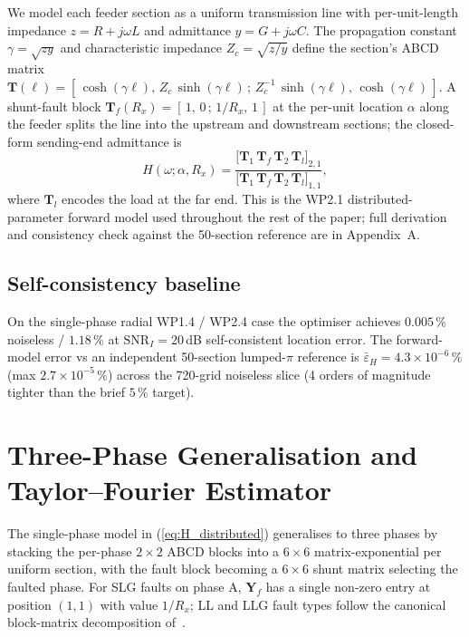 \documentclass[journal]{IEEEtran}
\newcommand{\headlineLocErrSelfConsistent}{$0.005\,\%$ noiseless / $1.18\,\%$ at $\mathrm{SNR}_I = 20$\,dB}
\newcommand{\headlineForwardErr}{$\bar{\varepsilon}_H = 4.3\!\times\!10^{-6}\,\%$ (max $2.7\!\times\!10^{-5}\,\%$)}
\begin{document}
We model each feeder section as a uniform transmission line
with per-unit-length impedance $z = R + j\omega L$ and
admittance $y = G + j\omega C$.  The propagation constant
$\gamma = \sqrt{zy}$ and characteristic impedance
$Z_c = \sqrt{z/y}$ define the section's ABCD matrix
$\boldsymbol{T}(\ell) = [\,\cosh(\gamma \ell),\, Z_c\,
\sinh(\gamma \ell)\,;\, Z_c^{-1}\,\sinh(\gamma \ell),\,
\cosh(\gamma \ell)\,]$.  A shunt-fault block
$\boldsymbol{T}_f(R_x) = [\,1,\,0\,;\,1/R_x,\,1\,]$ at the per-unit
location $\alpha$ along the feeder splits the line into the
upstream and downstream sections; the closed-form sending-end
admittance is
\begin{equation}
H(\omega; \alpha, R_x) =
  \frac{\bigl[\boldsymbol{T}_1\,\boldsymbol{T}_f\,\boldsymbol{T}_2\,\boldsymbol{T}_l\bigr]_{2,1}}
       {\bigl[\boldsymbol{T}_1\,\boldsymbol{T}_f\,\boldsymbol{T}_2\,\boldsymbol{T}_l\bigr]_{1,1}},
\label{eq:H_distributed}
\end{equation}
where $\boldsymbol{T}_l$ encodes the load at the far end.  This
is the WP2.1 distributed-parameter forward model used throughout
the rest of the paper; full derivation and consistency check
against the 50-section reference are in Appendix~A.

\subsection{Self-consistency baseline}
On the single-phase radial WP1.4 / WP2.4 case the optimiser
achieves \headlineLocErrSelfConsistent{} self-consistent
location error.  The forward-model error vs an independent
50-section lumped-$\pi$ reference is \headlineForwardErr{}
across the 720-grid noiseless slice (4 orders of magnitude
tighter than the brief $5\,\%$ target).

\section{Three-Phase Generalisation and Taylor--Fourier Estimator}\label{sec:tphase}

The single-phase model in (\ref{eq:H_distributed}) generalises
to three phases by stacking the per-phase $2 \times 2$ ABCD
blocks into a $6 \times 6$ matrix-exponential per uniform
section, with the fault block becoming a $6 \times 6$ shunt
matrix selecting the faulted phase.  For SLG faults on phase
A, $\boldsymbol{Y}_f$ has a single non-zero entry at position
$(1, 1)$ with value $1/R_x$; LL and LLG fault types follow the
canonical block-matrix decomposition of~\cite{Saha2010BookFL}.
\end{document}
